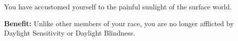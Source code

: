 
You have accustomed yourself to the painful sunlight of the surface world.

\textbf{Benefit:} Unlike other members of your race, you are no longer afflicted by Daylight Sensitivity or Daylight Blindness.